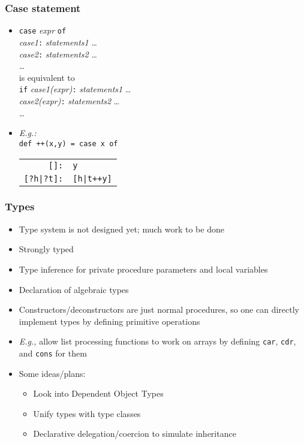 \documentclass[12pt]{beamer}
\begin{document}
\begin{frame}
\frametitle{Case statement}
\begin{itemize}
\item \texttt{case} \emph{expr} \texttt{of} \\
\hspace*{1em} \emph{case1}\texttt{:} \emph{statements1} \ldots \\
\hspace*{1em} \emph{case2}\texttt{:} \emph{statements2} \ldots \\
\hspace*{1em} \ldots \\[2ex]
is equivalent to \\[2ex]
 \texttt{if} \emph{case1(expr)}\texttt{:} \emph{statements1} \ldots \\
\hspace*{1em} \emph{case2(expr)}\texttt{:} \emph{statements2} \ldots \\
\hspace*{1em} \ldots
\item \emph{E.g.:}\\
  \texttt{def ++(x,y) = case x of} \\
\hspace*{3em}
\begin{tabular}{rl}
\texttt{[]:} & \texttt{y}\\
\texttt{[?h|?t]:} & \texttt{[h|t++y]}\\
\end{tabular}
\end{itemize}
\end{frame}


\begin{frame}
\frametitle{Types}
\begin{itemize}
\item Type system is not designed yet; much work to be done
\item Strongly typed
\item Type inference for private procedure parameters and local variables
\item Declaration of algebraic types
\item Constructors/deconstructors are just normal procedures, so one can
  directly implement types by defining primitive operations
\item \emph{E.g.,} allow list processing functions to work on arrays
  by defining \texttt{car}, \texttt{cdr}, and \texttt{cons} for them
\item Some ideas/plans:
  \begin{itemize}
  \item Look into Dependent Object Types
  \item Unify types with type classes
  \item Declarative delegation/coercion to simulate inheritance
  \end{itemize}
\end{itemize}
\end{frame}
\end{document}
